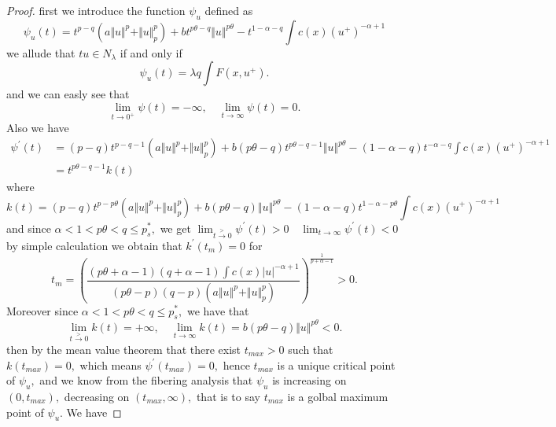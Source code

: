 \documentclass[10pt,twoside,reqno,centertags,draft]{amsart}
\begin{document}
\begin{proof}
first we introduce the function $ \psi_{u}$ defined as
\begin{equation}
\psi_{u}(t) = t^{p-q}(a \Vert u \Vert^p + \Vert u \Vert_{p}^{p}) + b t^{p \theta - q}\Vert u \Vert^{p \theta} - t^{1 -\alpha -q} \int c(x)(u^+)^{-\alpha+1}
\end{equation}
we allude that $ tu \in N_{\lambda}$ if and only if
\begin{equation*}
\psi_{u}(t) = \lambda q \int F(x,u^+).
\end{equation*}
and we can easly see that
\begin{equation*}
\lim_{t \to 0^+}\psi(t) = -\infty , \quad \lim_{t \to \infty} \psi(t) = 0.
\end{equation*}
Also we have
{\scriptsize
\begin{equation*}
\begin{aligned}
\psi^{\prime}(t) &= (p-q)t^{p-q-1}(a \Vert u \Vert^p + \Vert u \Vert_{p}^{p}) + b (p \theta - q) t^{p \theta - q -1}\Vert u \Vert^{p \theta} - (1 -\alpha -q)t^{ -\alpha -q} \int c(x)(u^+)^{-\alpha+1}\\
&= t^{p \theta - q -1} k(t)
\end{aligned}
\end{equation*}
}
where
{\footnotesize
\begin{equation*}
k(t) = (p-q)t^{p - p \theta}(a \Vert u \Vert^p + \Vert u \Vert_{p}^{p})+ b (p \theta - q) \Vert u \Vert^{p \theta} - (1 -\alpha -q)t^{1 -\alpha -p \theta} \int c(x)(u^+)^{-\alpha+1}
\end{equation*}
}
and since $ \alpha < 1 < p \theta < q \leq  p^*_s,$ we get $ \lim_{t \xrightarrow{>} 0}\psi^{\prime}(t) > 0 \quad \lim_{t \to \infty}\psi^{\prime}(t) < 0$
by simple calculation we obtain that $ k^{\prime}(t_{m}) =0$ for 
\begin{equation*}
t_m = \left( \frac{(p \theta +\alpha -1)(q +\alpha -1)\int c(x)\vert u\vert^{-\alpha+1}}{(p \theta - p)(q-p)(a \Vert u \Vert^p + \Vert u \Vert_{p}^{p})} \right)^{\frac{1}{p+ \alpha -1}} >0.
\end{equation*}
Moreover since $ \alpha < 1 < p \theta < q \leq  p^*_s,$ we have that
\begin{equation*}
\lim_{t \xrightarrow{>} 0}k(t) = +\infty ,\quad \lim_{t \to \infty}k(t) =  b (p \theta - q) \Vert u \Vert^{p \theta} <0.
\end{equation*}
then by the mean value theorem that there exist $ t_{max} >0$ such that $ k(t_{max}) =0,$ which means $ \psi^{\prime}(t_{max}) =0,$ hence $ t_{max}$ is a unique critical point of $ \psi_{u},$ and we know from the fibering analysis that $ \psi_{u}$ is increasing on $ (0,t_{max}),$ decreasing on $ (t_{max},\infty),$ that is to say $ t_{max}$ is a golbal maximum point of $ \psi_{u}.$ We have

\end{proof}
\end{document}
